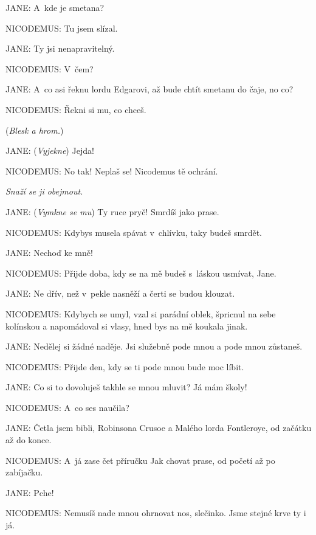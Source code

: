\noindent
JANE: A~kde je smetana?

\noindent
NICODEMUS: Tu jsem slízal.

\noindent
JANE: Ty jsi nenapravitelný.

\noindent
NICODEMUS: V čem?

\noindent
JANE: A~co asi řeknu lordu Edgarovi, až bude chtít smetanu do čaje, no co?

\noindent
NICODEMUS: Řekni si mu, co chceš.

\smallskip

\noindent
(\textit{Blesk a hrom.})

\smallskip

\noindent
JANE: (\textit{Vyjekne}) Jejda!

\noindent
NICODEMUS: No tak! Neplaš se! Nicodemus tě ochrání.

\smallskip

\noindent
\textit{Snaží se ji obejmout.}

\smallskip

\noindent
JANE: (\textit{Vymkne se mu}) Ty ruce pryč! Smrdíš jako prase.

\noindent
NICODEMUS: Kdybys musela spávat v chlívku, taky budeš smrdět.

\noindent
JANE: Nechoď ke mně!

\noindent
NICODEMUS: Přijde doba, kdy se na mě budeš s láskou usmívat, Jane.

\noindent
JANE: Ne dřív, než v pekle nasněží a čerti se budou klouzat.

\noindent
NICODEMUS: Kdybych se umyl, vzal si parádní oblek, špricnul na sebe kolínskou a napomádoval si vlasy, hned bys na mě koukala jinak.

\noindent
JANE: Nedělej si žádné naděje. Jsi služebně pode mnou a pode mnou zůstaneš.

\noindent
NICODEMUS: Přijde den, kdy se ti pode mnou bude moc líbit.

\noindent
JANE: Co si to dovoluješ takhle se mnou mluvit? Já mám školy!

\noindent
NICODEMUS: A~co ses naučila?

\noindent
JANE: Četla jsem bibli, Robinsona Crusoe a Malého lorda Fontleroye, od začátku až do konce.

\noindent
NICODEMUS: A~já zase čet příručku Jak chovat prase, od početí až po zabíjačku.

\noindent
JANE: Pche!

\noindent
NICODEMUS: Nemusíš nade mnou ohrnovat nos, slečinko. Jsme stejné krve ty i já.

